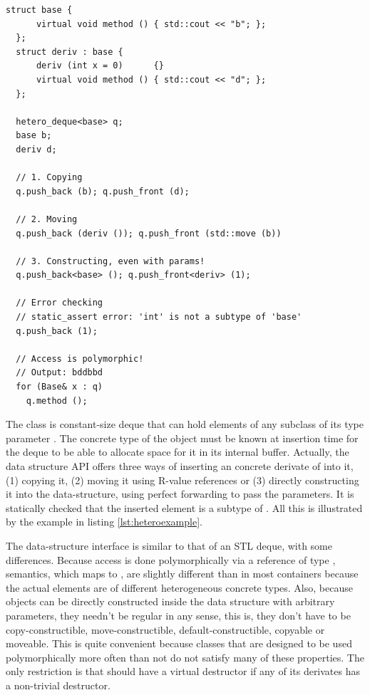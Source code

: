 \begin{lstlisting}[float=h!,caption=Example of usage of heterogeneous deques,label=lst:heteroexample]
  struct base {
      virtual void method () { std::cout << "b"; };
  };
  struct deriv : base { 
      deriv (int x = 0)      {} 
      virtual void method () { std::cout << "d"; };
  };

  hetero_deque<base> q;
  base b;
  deriv d;

  // 1. Copying
  q.push_back (b); q.push_front (d);

  // 2. Moving
  q.push_back (deriv ()); q.push_front (std::move (b))

  // 3. Constructing, even with params!
  q.push_back<base> (); q.push_front<deriv> (1);

  // Error checking
  // static_assert error: 'int' is not a subtype of 'base'
  q.push_back (1); 

  // Access is polymorphic!
  // Output: bddbbd
  for (Base& x : q)
    q.method ();
\end{lstlisting}

The class  is
constant-size deque that can hold elements of any subclass of its type
parameter . The concrete type of the object must be known
at insertion time for the deque to be able to allocate space for it in
its internal buffer. Actually, the data structure API offers three
ways of inserting an concrete derivate of  into it, (1)
copying it, (2) moving it using R-value references or (3) directly
constructing it into the data-structure, using perfect forwarding to
pass the parameters. It is statically checked that the inserted
element is a subtype of . All this is illustrated by the
example in listing \ref{lst:heteroexample}.

The data-structure interface is similar to that of an STL deque, with
some differences. Because access is done polymorphically via a
reference of type ,  semantics, which
maps to , are slightly different than in most containers
because the actual elements are of different heterogeneous concrete
types. Also, because objects can be directly constructed inside the
data structure with arbitrary parameters, they needn't be regular in
any sense, this is, they don't have to be copy-constructible,
move-constructible, default-constructible, copyable or moveable. This
is quite convenient because classes that are designed to be used
polymorphically more often than not do not satisfy many of these
properties. The only restriction is that  should have a
virtual destructor if any of its derivates has a non-trivial
destructor.

